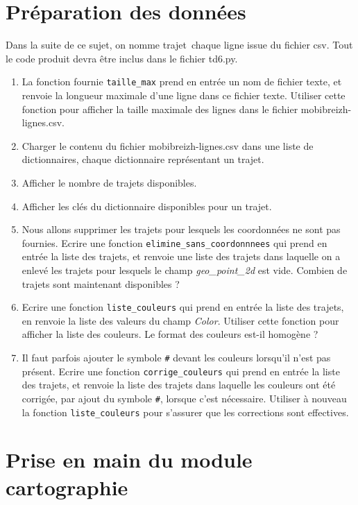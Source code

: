 \documentclass[11pt,a4paper]{article}
\begin{document}
\section{Préparation des données}
Dans la suite de ce sujet, on nomme \og trajet\fg ~chaque ligne issue du fichier csv.
Tout le code produit devra être inclus dans le fichier td6.py.
\begin{enumerate}
\item La fonction fournie \verb+taille_max+ prend en entrée un nom de fichier texte, et renvoie la longueur maximale d'une ligne dans ce fichier texte. Utiliser cette fonction pour afficher la taille maximale des lignes dans le fichier mobibreizh-lignes.csv.

\item Charger le contenu du fichier mobibreizh-lignes.csv dans une liste de dictionnaires, chaque dictionnaire représentant un trajet.
\item Afficher le nombre de trajets disponibles.
\item Afficher les clés du dictionnaire disponibles pour un trajet.
\item Nous allons supprimer les trajets pour lesquels les coordonnées ne sont pas fournies. Ecrire une fonction \verb+elimine_sans_coordonnnees+ qui prend en entrée la liste des trajets, et renvoie une liste des trajets dans laquelle on a enlevé les trajets pour lesquels le champ \emph{geo\_point\_2d} est vide. Combien de trajets sont maintenant disponibles ? 
\item Ecrire une fonction \verb+liste_couleurs+ qui prend en entrée la liste des trajets, en renvoie la liste des valeurs du champ \emph{Color}. Utiliser cette fonction pour afficher la liste des couleurs. Le format des couleurs est-il homogène ? 
\item Il faut parfois ajouter le symbole \verb+#+ devant les couleurs lorsqu'il n'est pas présent. Ecrire une fonction  \verb+corrige_couleurs+ qui prend en entrée la liste des trajets, et renvoie la liste 
des trajets dans laquelle les couleurs ont été corrigée, par ajout du symbole \verb+#+, lorsque c'est nécessaire. Utiliser à nouveau la fonction  \verb+liste_couleurs+ pour s'assurer que les corrections sont effectives.
\end{enumerate}


\section{Prise en main du module cartographie}
\end{document}

